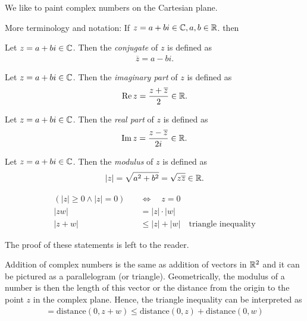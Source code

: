 We like to paint complex numbers on the Cartesian plane. %

More terminology and notation: If $z=a+bi \in \mathbb C, a,b\in \mathbb R$. then
\begin{df}
	Let $z=a+bi \in \mathbb C$. Then the \emph{conjugate} of $z$ is defined as
	\begin{align*}
	\overline z = a-bi.
	\end{align*}
\end{df}
\begin{df}
	Let $z=a+bi \in \mathbb C$. Then the \emph{imaginary part} of $z$ is defined as
	\begin{align*}
	\operatorname{Re} z = \frac{z+\overline z} 2 \in \mathbb R.
	\end{align*}
\end{df}
\begin{df}
	Let $z=a+bi \in \mathbb C$. Then the \emph{real part} of $z$ is defined as
	\begin{align*}
	\operatorname{Im} z = \frac{z-\overline z}{2i}\in \mathbb R.
	\end{align*}
\end{df}
\begin{df}
	Let $z=a+bi \in \mathbb C$. Then the \emph{modulus} of $z$ is defined as
	\begin{align*}
	|z| = \sqrt{a^2+b^2} = \sqrt{z\overline z} \in \mathbb R.
	\end{align*}
\end{df}


\begin{pp}
	\begin{align*}
	(|z| \ge 0 \wedge |z| = 0) \quad & \Leftrightarrow\quad z = 0 \\
	|zw| & = |z| \cdot|w| \\
	|z + w| & \le |z| + |w| \quad \text{triangle inequality}
	\end{align*}
\end{pp}

\begin{ec}
	The proof of these statements is left to the reader.
\end{ec}

Addition of complex numbers is the same as addition of vectors in $\mathbb R^2$ and it can be pictured as a parallelogram (or triangle). Geometrically, the modulus of a number is then the length of this vector or the distance from the origin to the point $z$ in the complex plane. Hence, the triangle inequality can be interpreted as
\begin{align*}
= \text{distance} (0,z+w) \le \text{distance} (0,z) + \text{distance} (0,w)
\end{align*}

